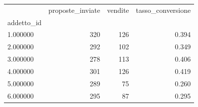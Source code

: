 \begin{tabular}{lrrr}
\toprule
 & proposte_inviate & vendite & tasso_conversione \\
addetto_id &  &  &  \\
\midrule
1.000000 & 320 & 126 & 0.394 \\
2.000000 & 292 & 102 & 0.349 \\
3.000000 & 278 & 113 & 0.406 \\
4.000000 & 301 & 126 & 0.419 \\
5.000000 & 289 & 75 & 0.260 \\
6.000000 & 295 & 87 & 0.295 \\
\bottomrule
\end{tabular}
